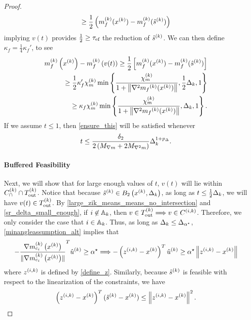 \begin{proof}
\begin{align*}
\ge \frac 1 2 \left(m_f^{(k)}(x^{(k)}) - m_f^{(k)}({{\hat s}^{(k)}} )\right)
\end{align*}
implying $v(t)$ provides $\frac 1 2 \ge {\tau_{\textrm{ef}}}$ the reduction of ${{\hat s}^{(k)}} $.
We can then define $\kappa_f = \frac 1 4 \kappa_f'$, to see
\begin{align*}
m_f^{(k)}\left(x^{(k)}\right) - m_f^{(k)}\left(v(t)\right)
\ge \frac 1 2 \left[m_f^{(k)}(x^{(k)}) - m_f^{(k)}({{\hat s}^{(k)}} )\right] \\
\ge \frac 1 2 \kappa_f' {\chi_m^{(k)}} \min\left\{ \frac{{\chi_m^{(k)}}}{1+\left\|\nabla^2 {{m}_f}^{(k)}(x^{(k)})\right\|}, \frac 1 2 \Delta_k, 1 \right\} \\
\ge \kappa_f {\chi_m^{(k)}} \min\left\{ \frac{{\chi_m^{(k)}}}{1+\left\|\nabla^2 {{m}_f}^{(k)}(x^{(k)})\right\|}, \Delta_k, 1 \right\}.
\end{align*}
If we assume $t \le 1$, then \cref{ensure_this} will be satisfied whenever
\begin{align*}
t \le \frac {\delta_2}{2\left({M_{\nabla m}} + 2{M_{\nabla^2 m}}\right)} \Delta_k^{1 + p_{\Delta}}.
\end{align*}




\paragraph*{Buffered Feasibility}
Next, we will show that for large enough values of $t$, $v(t)$ will lie within ${C^{(k)}_{\cap}} \cap {T_{\text{out}}^{(k)}}$.
Notice that because ${{\hat s}^{(k)}}  \in B_2\left(x^{(k)}, \Delta_k\right)$, as long as $t \le \frac 1 2 \Delta_k$, we will have $v(t) \in {T_{\text{out}}^{(k)}}$.
By \cref{large_zik_means_means_no_intersection} and \cref{sr_delta_small_enough}, if $i \not \in {\mathbb A_{k}}$, then $v \in {T_{\text{out}}^{(k)}} \Longrightarrow v \in {C^{(i, k)}}$.
Therefore, we only consider the case that $i \in {\mathbb A_{k}}$.
Thus, as long as $\Delta_k \le {\Delta_{\alpha^{\star}}}$, \cref{minangleassumption_alt} implies that
\begin{align}
-\frac {{\nabla m_{c_i}^{(k)}\left(x^{(k)}\right)}}{\|{\nabla m_{c_i}^{(k)}\left(x^{(k)}\right)}\|} ^T{{\hat u}^{(k)}} \ge { \alpha^{\star} } \Longrightarrow -\left({z^{(i, k)}} - x^{(k)}\right)^T{{\hat u}^{(k)}} \ge { \alpha^{\star} } \left\|{z^{(i, k)}} - x^{(k)}\right\| \label{u_is_feasible}
\end{align}
where ${z^{(i, k)}}$ is defined by \cref{define_z}.
Similarly, because ${{\hat s}^{(k)}} $ is feasible with respect to the linearization of the constraints, we have
\begin{align}
\left({z^{(i, k)}} - x^{(k)}\right)^T({{\hat s}^{(k)}}  - x^{(k)}) \le \left\|{z^{(i, k)}} - x^{(k)}\right\|^2. \label{gc_is_feasible}
\end{align}


\end{proof}
